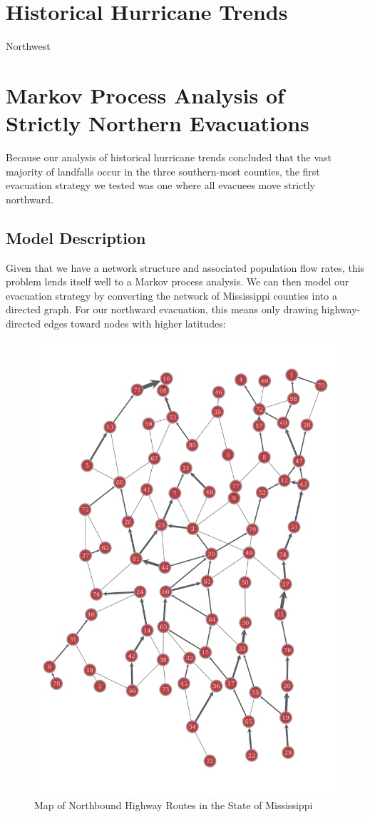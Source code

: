 \documentclass[titlepage]{article}
\begin{document}
\section{Historical Hurricane Trends}
\label{sec:hurricanes}
  \par
    Northwest


\section{Markov Process Analysis of Strictly Northern Evacuations}
\label{sec:markov}
  Because our analysis of historical hurricane trends concluded that the vast majority of landfalls occur in the three southern-most counties, the first evacuation strategy we tested was one where all evacuees move strictly northward.
  \subsection{Model Description}
    Given that we have a network structure and associated population flow rates, this problem lends itself well to a Markov process analysis. We can then model our evacuation strategy by converting the network of Mississippi counties into a directed graph. For our northward evacuation, this means only drawing highway-directed edges toward nodes with higher latitudes:
    \begin{figure}[H]
      \centering
      \includegraphics[width=.5\textwidth]{figures/full_directed_NS.pdf}
      \caption{Map of Northbound Highway Routes in the State of Mississippi \cite{ms_highways}}
    \end{figure}
\end{document}
